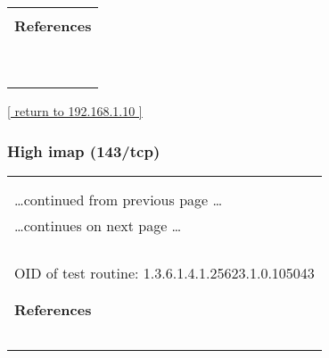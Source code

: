 \documentclass{article}
\begin{document}
\begin{longtable}{|p{}|}
      \hline
      \\
\textbf{References}\\
\rowcolor{white}{\verb=CVE: CVE-2010-2227=}\\
\rowcolor{white}{\verb=BID:41544=}\\
\rowcolor{white}{\verb=Other:=}\\
\rowcolor{white}{\verb=  URL:https://www.securityfocus.com/bid/41544=}\\
\rowcolor{white}{\verb=   URL:http://tomcat.apache.org/security-5.html=}\\
\rowcolor{white}{\verb=   URL:http://tomcat.apache.org/security-6.html=}\\
\rowcolor{white}{\verb=   URL:http://tomcat.apache.org/security-7.html=}\\
\rowcolor{white}{\verb=   URL:http://tomcat.apache.org/=}\\
\rowcolor{white}{\verb=   URL:http://www.securityfocus.com/archive/1/512272=}\\
\end{longtable}

\begin{footnotesize}\hyperref[host:192.168.1.10]{[ return to 192.168.1.10 ]}\end{footnotesize}
\subsubsection{High imap (143/tcp)}
\label{port:192.168.1.10 imap (143/tcp) High}

\begin{longtable}{|p{}|}
\hline
\rowcolor{openvas_hole}{\color{white}{High (CVSS: 6.8) }}\\
\rowcolor{openvas_hole}{\color{white}{NVT: OpenSSL CCS Man in the Middle Security Bypass Vulnerability (STARTTLS Check)}}\\
\hline
\endfirsthead
\hfill\ldots continued from previous page \ldots \\
\hline
\endhead
\hline
\ldots continues on next page \ldots \\
\endfoot
\hline
\endlastfoot
\\
\rowcolor{white}{\verb==}\\
\rowcolor{white}{\verb==}\\
\\
OID of test routine: 1.3.6.1.4.1.25623.1.0.105043\\
\\

      \hline
      \\
\textbf{References}\\
\rowcolor{white}{\verb=CVE: CVE-2014-0224=}\\
\rowcolor{white}{\verb=BID:67899=}\\
\rowcolor{white}{\verb=Other:=}\\
\rowcolor{white}{\verb=  URL:http://www.securityfocus.com/bid/67899=}\\
\rowcolor{white}{\verb=   URL:http://openssl.org/=}\\
\end{longtable}
\end{document}
